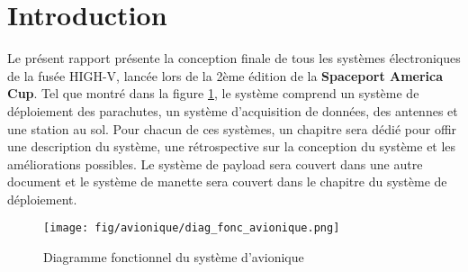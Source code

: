 \section{Introduction}
\label{chap:intro}

Le présent rapport présente la conception finale de tous les systèmes
électroniques de la fusée HIGH-V, lancée lors de la 2ème édition de la
\textbf{Spaceport America Cup}. Tel que montré dans la figure
\ref{f:diag_fonc_avionique}, le système comprend un système de déploiement des
parachutes, un système d'acquisition de données, des antennes et une station
au sol. Pour chacun de ces systèmes, un chapitre sera dédié pour offir une
description du système, une rétrospective sur la conception du système et les
améliorations possibles. Le système de payload sera couvert dans une autre
document et le système de manette sera couvert dans le chapitre du système
de déploiement.

\begin{figure}[H]
	\center
	\texttt{[image: fig/avionique/diag\_fonc\_avionique.png]}
	\caption{Diagramme fonctionnel du système d'avionique}
	\label{f:diag_fonc_avionique}
\end{figure}
